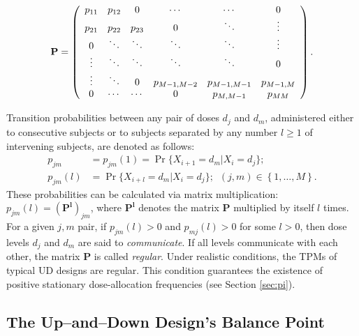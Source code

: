 \begin{equation}\label{eq:genericPmat}
\bf{P}=\left(
\begin{array}{cccccc}
  p_{11}& p_{12} & 0 & \cdots & \cdots & 0 \\
  p_{21} & p_{22} & p_{23} & 0 & \ddots & \vdots \\
  0 & \ddots & \ddots & \ddots & \ddots & \vdots \\
  \vdots & \ddots & \ddots & \ddots & \ddots & 0 \\
  \vdots & \ddots & 0 & p_{M-1,M-2} & p_{M-1,M-1} & p_{M-1,M} \\
  0 & \cdots & \cdots & 0 & p_{M,M-1} & p_{MM}\\
\end{array}
\right).
\end{equation}

Transition probabilities between any pair of doses $d_j$ and $d_m$, administered either to consecutive subjects or to subjects separated by any number $l\geq 1$ of intervening subjects, are denoted as follows:
\begin{equation*}
\begin{array}{rl}
p_{jm}&=p_{jm}(1)=\Pr\{X_{i+1}=d_m|X_i=d_j\};\\
p_{jm}(l)&=\Pr\{X_{i+l}=d_m|X_i=d_j\};\,\,\,(j,m)\in\left\{1,\ldots,M\right\}.
\end{array}
\end{equation*}
These probabilities can be calculated via matrix multiplication: $p_{jm}(l)=\left(\mathbf{P^l}\right)_{jm}$, where $\mathbf{P^l}$ denotes the matrix $\mathbf{P}$ multiplied by itself $l$ times. For a given $j,m$ pair, if $p_{jm}(l)>0$ and $p_{mj}(l)>0$  for some $l>0$, then dose levels $d_j$ and $d_m$ are said to \emph{communicate}. If all levels communicate with each other, the matrix $\mathbf{P}$ is called \emph{regular}. Under realistic conditions, the TPMs of typical UD designs are regular.  This condition guarantees the existence of positive stationary dose-allocation frequencies (see Section \ref{sec:pi}).


\subsection{The Up--and--Down Design's Balance Point}\label{sec:balpoint}

